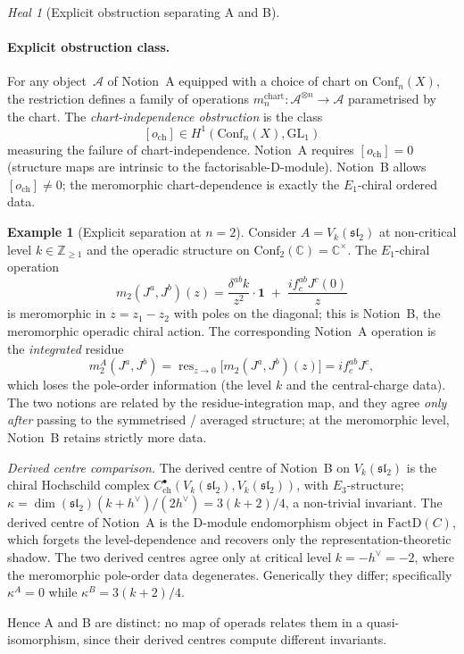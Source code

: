 \documentclass[11pt]{article}
\theoremstyle{definition}
\newtheorem{exmp}[thm]{Example}
\theoremstyle{remark}
\newtheorem{heal}[thm]{Heal}
\newcommand{\bC}{\mathbb{C}}
\newcommand{\bZ}{\mathbb{Z}}
\newcommand{\cA}{\mathcal{A}}
\newcommand{\fsl}{\mathfrak{sl}}
\newcommand{\Conf}{\mathrm{Conf}}
\newcommand{\Eone}{E_1}
\newcommand{\Ethree}{E_3}
\newcommand{\ch}{\mathrm{ch}}
\DeclareMathOperator{\res}{res}
\begin{document}
\begin{heal}[Explicit obstruction separating A and B]
\paragraph{Explicit obstruction class.}
For any object~$\cA$ of Notion~A equipped with a choice of chart
on $\Conf_n(X)$, the restriction defines a family of operations
$m_n^{\mathrm{chart}}\colon \cA^{\otimes n} \to \cA$ parametrised by
the chart. The \emph{chart-independence obstruction} is the class
\[
[o_{\mathrm{ch}}] \in H^1(\Conf_n(X), \mathrm{GL}_1)
\]
measuring the failure of chart-independence. Notion~A requires
$[o_{\mathrm{ch}}] = 0$ (structure maps are intrinsic to the
factorisable-D-module). Notion~B allows $[o_{\mathrm{ch}}] \neq 0$;
the meromorphic chart-dependence is exactly the $\Eone$-chiral
ordered data.

\begin{exmp}[Explicit separation at $n = 2$]
\label{ex:A-vs-B}
Consider $A = V_k(\fsl_2)$ at non-critical level $k \in \bZ_{\geq 1}$
and the operadic structure on $\Conf_2(\bC) = \bC^\times$. The
$\Eone$-chiral operation
\[
m_2(J^a, J^b)(z) = \frac{\delta^{ab} k}{z^2} \cdot \mathbf{1}
\;+\; \frac{i f^{ab}_c J^c(0)}{z}
\]
is meromorphic in $z = z_1 - z_2$ with poles on the diagonal; this
is Notion~B, the meromorphic operadic chiral action. The
corresponding Notion~A operation is the \emph{integrated} residue
\[
m_2^A(J^a, J^b) = \res_{z \to 0}\bigl[m_2(J^a, J^b)(z)\bigr]
= i f^{ab}_c J^c,
\]
which loses the pole-order information (the level $k$ and the
central-charge data). The two notions are related by the
residue-integration map, and they agree \emph{only after} passing
to the symmetrised / averaged structure; at the meromorphic level,
Notion~B retains strictly more data.

\emph{Derived centre comparison.} The derived centre of Notion~B on
$V_k(\fsl_2)$ is the chiral Hochschild complex
$C^\bullet_{\ch}(V_k(\fsl_2), V_k(\fsl_2))$, with
$\Ethree$-structure; $\kappa = \dim(\fsl_2)(k + h^\vee)/(2h^\vee)
= 3(k+2)/4$, a non-trivial invariant. The derived centre of
Notion~A is the D-module endomorphism object in $\mathrm{FactD}(C)$,
which forgets the level-dependence and recovers only the
representation-theoretic shadow. The two derived centres agree
only at critical level $k = -h^\vee = -2$, where the meromorphic
pole-order data degenerates. Generically they differ; specifically
$\kappa^A = 0$ while $\kappa^B = 3(k+2)/4$.

Hence A and B are distinct: no map of operads relates them in a
quasi-isomorphism, since their derived centres compute different
invariants.
\end{exmp}


\end{heal}
\end{document}
